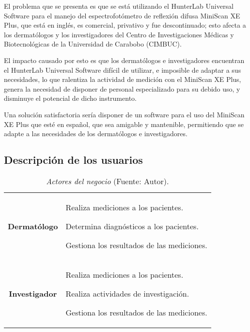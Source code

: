 	El problema que se presenta es que se est\'{a} utilizando el HunterLab Universal Software para el manejo del espectrofot\'{o}metro de reflexi\'{o}n difusa MiniScan XE Plus, que est\'{a} en ingl\'{e}s, es comercial, privativo y fue descontinuado; esto afecta a los dermat\'{o}logos y los investigadores del Centro de Investigaciones M\'{e}dicas y Biotecnol\'{o}gicas de la Universidad de Carabobo (CIMBUC).
	
	El impacto causado por esto es que los dermat\'{o}logos e investigadores encuentran el HunterLab Universal Software dif\'{i}cil de utilizar, e imposible de adaptar a sus necesidades, lo que ralentiza la actividad de medici\'{o}n con el MiniScan XE Plus, genera la necesidad de disponer de personal especializado para su debido uso, y disminuye el potencial de dicho instrumento.
	
	Una soluci\'{o}n satisfactoria ser\'{i}a disponer de un software para el uso del \mbox{MiniScan} XE Plus que est\'{e} en espa\~{n}ol, que sea amigable y mantenible, permitiendo que se adapte a las necesidades de los dermat\'{o}logos e investigadores.
	
	\subsection{Descripci\'{o}n de los usuarios}
	
		\begin{table}[h]
		\small
		\caption[Actores del negocio]{\textit{Actores del negocio} (Fuente: Autor).}
		\centering
		\setlength{\extrarowheight}{\altocelda}
		\begin{tabulary}{\anchotabla}{|c|J|}
			\hline
			 & \\ \hline
			\textbf{Dermat\'{o}logo} & 
			Realiza mediciones a los pacientes.
			
			Determina diagn\'{o}sticos a los pacientes.
			
			Gestiona los resultados de las mediciones.
		\\ \hline
			\textbf{Investigador} &
			Realiza mediciones a los pacientes.
			
			Realiza actividades de investigaci\'{o}n.
			
			Gestiona los resultados de las mediciones.\\ \hline
		\end{tabulary}
	\end{table}
	
